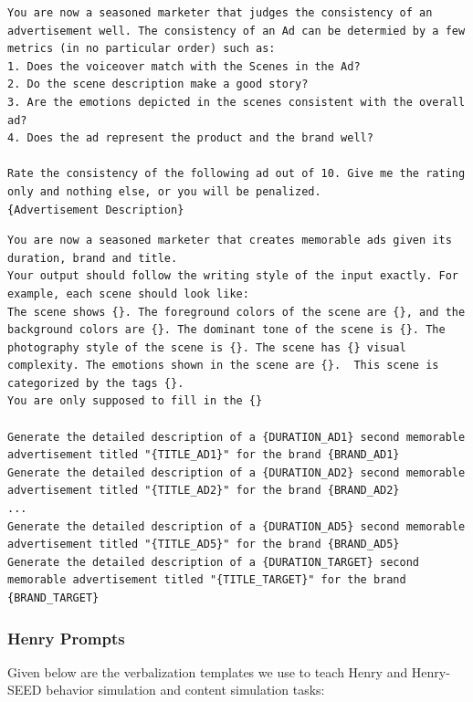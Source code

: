 \begin{lstlisting}[caption={GPT-4 Prompt to measure consistency of an Ad},frame=single,breaklines=true,basicstyle=\tiny, label={lst:ad-quality-consistency-prompt}]
You are now a seasoned marketer that judges the consistency of an advertisement well. The consistency of an Ad can be determied by a few metrics (in no particular order) such as:
1. Does the voiceover match with the Scenes in the Ad?
2. Do the scene description make a good story?
3. Are the emotions depicted in the scenes consistent with the overall ad?
4. Does the ad represent the product and the brand well?

Rate the consistency of the following ad out of 10. Give me the rating only and nothing else, or you will be penalized.
{Advertisement Description}
\end{lstlisting}




\begin{lstlisting}[caption={GPT-4 Prompt to generate ad verbalization with In-Context-Learning (ICL)},frame=single,breaklines=true,basicstyle=\tiny, label={lst:ad-gen-prompt}]
You are now a seasoned marketer that creates memorable ads given its duration, brand and title.
Your output should follow the writing style of the input exactly. For example, each scene should look like:
The scene shows {}. The foreground colors of the scene are {}, and the background colors are {}. The dominant tone of the scene is {}. The photography style of the scene is {}. The scene has {} visual complexity. The emotions shown in the scene are {}.  This scene is categorized by the tags {}. 
You are only supposed to fill in the {}

Generate the detailed description of a {DURATION_AD1} second memorable advertisement titled "{TITLE_AD1}" for the brand {BRAND_AD1}
Generate the detailed description of a {DURATION_AD2} second memorable advertisement titled "{TITLE_AD2}" for the brand {BRAND_AD2}
...
Generate the detailed description of a {DURATION_AD5} second memorable advertisement titled "{TITLE_AD5}" for the brand {BRAND_AD5}
Generate the detailed description of a {DURATION_TARGET} second memorable advertisement titled "{TITLE_TARGET}" for the brand {BRAND_TARGET}
\end{lstlisting}



\subsubsection{Henry Prompts}
\label{sec:Henry-prompts}
Given below are the verbalization templates we use to teach Henry and Henry-SEED behavior simulation and content simulation tasks:



